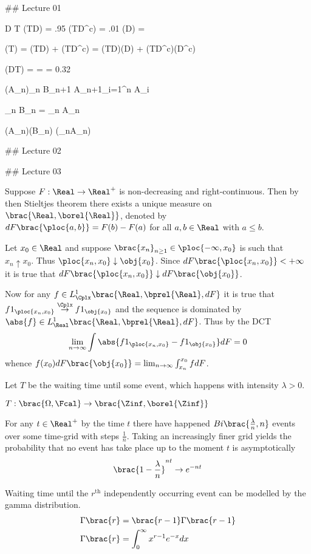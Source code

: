 
## Lecture 01

D {}
T {}
\Pr(T\vert D) = .95
\Pr(T\vert D^c) = .01
\Pr(D) = 

\Pr(T) = \Pr(T\cap D) + \Pr(T\cap D^c) = \Pr(T\vert D)\Pr(D) + \Pr(T\vert D^c)\Pr(D^c)

\Pr(D\vert T) =  =  = 0.32

(A_n)_{n}\in \Fcal
B_{n+1}  A_{n+1}\setminus \bigcup_{i=1}^n A_i

\biguplus_{n} B_n = \bigcap_{n} A_n

\Pr(A_n)\leq \Pr(B_n)
\Pr(\bigcup_{n\geq}A_n)


## Lecture 02

## Lecture 03

Suppose $F:\Real\to \Real^+$ is non-decreasing and right-continuous. Then by then Stieltjes theorem there exists a unique measure on $\brac{\Real, \borel{\Real}}$, denoted by $dF\brac{\ploc{a,b}} = F(b)-F(a)$ for all $a, b\in\Real$ with $a\leq b$.

Let $x_0\in \Real$ and suppose $\brac{x_n}_{n\geq1}\in \ploc{-\infty, x_0}$ is such that $x_n\uparrow x_0$. Thus $\ploc{x_n,x_0}\downarrow\obj{x_0}$. Since $dF\brac{\ploc{x_n, x_0}} < +\infty$ it is true that $dF\brac{\ploc{x_n,x_0}}\downarrow dF\brac{\obj{x_0}}$.

Now for any $f\in L^1_\Cplx\brac{\Real,\bprel{\Real},dF}$ it is true that $f 1_{\ploc{x_n,x_0}}\overset{\Cplx}{\to} f 1_{\obj{x_0}}$ and the sequence is dominated by $\abs{f}\in L^1_\Real\brac{\Real,\bprel{\Real},dF}$. Thus by the DCT \[\lim_{n\to \infty} \int \abs{f 1_{\ploc{x_n,x_0}} - f 1_{\obj{x_0}}} dF = 0\] whence $f(x_0)dF\brac{\obj{x_0}} = \lim_{n\to \infty} \int^{x_0}_{x_n} f dF$.

Let $T$ be the waiting time until some event, which happens with intensity $\lambda>0$.

$T:\brac{\Omega, \Fcal}\to\brac{\Zinf,\borel{\Zinf}}$

For any $t\in \Real^+$ by the time $t$ there have happened $Bi\brac{\frac{\lambda}{n}, n}$ events over some time-grid with steps $\frac{1}{n}$. Taking an increasingly finer grid yields the probability that no event has take place up to the moment $t$ is asymptotically \[\brac{1-\frac{\lambda}{n}}^{nt}\to e^{-nt}\]

Waiting time until the $r^\text{th}$ independently occurring event can be modelled by the gamma distribution. \begin{align*}
\Gamma\brac{r} &= \brac{r-1} \Gamma\brac{r-1}\\
\Gamma\brac{r} &= \int_0^\infty x^{r-1} e^{-x} dx\\\end{align*}

